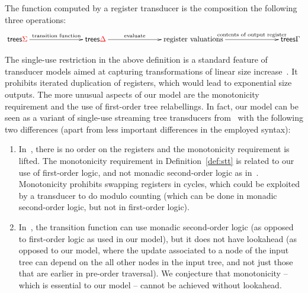 The function computed by a register transducer is the composition the following three operations:
\begin{align*}
\xymatrix@C=2.5cm{
    \trees {\rSigma} \ar[r]^{\text{transition function}} & \trees {\rDelta} \ar[r]^-{
    \text{evaluate}
    } & \text{register valuations} \ar[r]^-{\text{contents of output register}} & \trees \Gamma
}
\end{align*}

The  single-use restriction in the above definition is a standard feature of transducer models aimed at capturing transformations of linear size increase~\cite{alurStreamingStringTransducers2011,alur2017streaming}. It prohibits iterated duplication of registers, which would lead to exponential size outputs. The more unusual aspects of our model are the monotonicity requirement and the use of first-order tree relabellings. In fact, our model can be seen as a variant of  single-use streaming tree transducers from~\cite{alur2017streaming} with the following two differences (apart from less important differences in the employed syntax):
\begin{enumerate}
    \item  In~\cite{alur2017streaming}, there is no order on the registers and the monotonicity requirement is lifted. The monotonicity requirement in Definition~\ref{def:stt}  is related to our use of first-order logic, and not monadic second-order logic as in~\cite{alur2017streaming}. Monotonicity    prohibits swapping registers in cycles, which could be exploited by a transducer to do modulo counting (which can be done in monadic second-order logic, but not in first-order logic).
    \item In~\cite{alur2017streaming}, the transition function can use monadic second-order logic (as opposed to first-order logic as used in our model), but it does not have lookahead (as opposed to our model, where the update associated to a node  of the input tree can depend on the all other nodes in the input tree, and not just those that are earlier in pre-order traversal).  We conjecture that monotonicity -- which is essential to our model -- cannot be achieved without   lookahead.
\end{enumerate}

